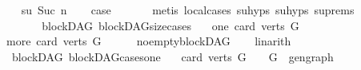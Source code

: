 \begin{isabellebody}
\isanewline
\ \ \isamarkupfalse%
\ su{\isacharcolon}{\kern0pt}\ {\isacharparenleft}{\kern0pt}Suc\ n{\isacharparenright}{\kern0pt}\isanewline
\ \ \isamarkupfalse%
\ {\isacharquery}{\kern0pt}case\ \isanewline
\ \ \ \ \isamarkupfalse%
\ {\isacharparenleft}{\kern0pt}metis\ local{\isachardot}{\kern0pt}cases{\isacharparenleft}{\kern0pt}{}{\isacharparenright}{\kern0pt}\ su{\isachardot}{\kern0pt}hyps{\isacharparenleft}{\kern0pt}{}{\isacharparenright}{\kern0pt}\ su{\isachardot}{\kern0pt}hyps{\isacharparenleft}{\kern0pt}{}{\isacharparenright}{\kern0pt}\ su{\isachardot}{\kern0pt}prems{\isacharparenright}{\kern0pt}\ \ \ \isanewline
\ \ \isamarkupfalse%
\ \ \ \isanewline
{}\isamarkupfalse%
%
\endisatagproof
{\isafoldproof}%
%
\isadelimproof
\ \isanewline
%
\endisadelimproof
\isanewline
\isanewline
{}\isamarkupfalse%
\ {\isacharparenleft}{\kern0pt}\ blockDAG{\isacharparenright}{\kern0pt}\ blockDAG{\isacharunderscore}{\kern0pt}size{\isacharunderscore}{\kern0pt}cases{\isacharcolon}{\kern0pt}\isanewline
\ \ \ {\isacharparenleft}{\kern0pt}one{\isacharparenright}{\kern0pt}\ {\isachardoublequoteopen}card\ {\isacharparenleft}{\kern0pt}verts\ G{\isacharparenright}{\kern0pt}\ {\isacharequal}{\kern0pt}\ {}{\isachardoublequoteclose}\ \isanewline
{\isacharbar}{\kern0pt}\ {\isacharparenleft}{\kern0pt}more{\isacharparenright}{\kern0pt}\ {\isachardoublequoteopen}card\ {\isacharparenleft}{\kern0pt}verts\ G{\isacharparenright}{\kern0pt}\ {\isachargreater}{\kern0pt}\ {}{\isachardoublequoteclose}\isanewline
%
\isadelimproof
\ \ %
\endisadelimproof
%
\isatagproof
{}\isamarkupfalse%
\ no{\isacharunderscore}{\kern0pt}empty{\isacharunderscore}{\kern0pt}blockDAG\isanewline
\ \ \isamarkupfalse%
\ linarith%
\endisatagproof
{\isafoldproof}%
%
\isadelimproof
\ \isanewline
%
\endisadelimproof
\isanewline
{}\isamarkupfalse%
\ {\isacharparenleft}{\kern0pt}\ blockDAG{\isacharparenright}{\kern0pt}\ blockDAG{\isacharunderscore}{\kern0pt}cases{\isacharunderscore}{\kern0pt}one{\isacharcolon}{\kern0pt}\isanewline
\ \ \ {\isachardoublequoteopen}card\ {\isacharparenleft}{\kern0pt}verts\ G{\isacharparenright}{\kern0pt}\ {\isacharequal}{\kern0pt}\ {}\ {\isasymlongrightarrow}\ {\isacharparenleft}{\kern0pt}G\ {\isacharequal}{\kern0pt}\ gen{\isacharunderscore}{\kern0pt}graph{\isacharparenright}{\kern0pt}{\isachardoublequoteclose}\isanewline

\end{isabellebody}
